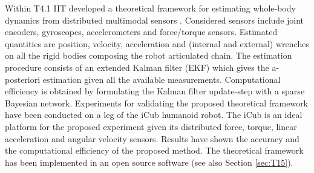 

Within T4.1 IIT developed a theoretical framework for estimating whole-body dynamics from distributed multimodal sensors \cite{Nori2015}. Considered sensors include joint encoders, gyroscopes, accelerometers and force/torque sensors. Estimated quantities are position, velocity, acceleration and (internal and external) wrenches on all the rigid bodies composing the robot articulated chain. The estimation procedure consists of an extended Kalman filter (EKF) which gives the a-posteriori estimation given all the available measurements. Computational efficiency is obtained by formulating the Kalman filter update-step with a sparse Bayesian network. Experiments for validating the proposed theoretical framework have been conducted on a leg of the iCub humanoid robot. The iCub is an ideal platform for the proposed experiment given its distributed force, torque, linear acceleration and angular velocity sensors. Results have shown the accuracy and the computational efficiency of the proposed method. The theoretical framework has been implemented in an open source software (see also Section \ref{sec:T15}).